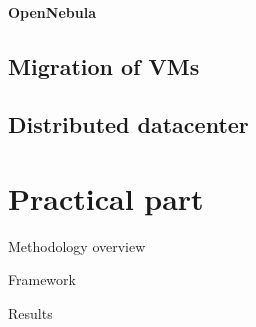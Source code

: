 \documentclass[12pt,oneside,a4paper]{report} %
\begin{document}
			\subsubsection{OpenNebula}

	\section{Migration of VMs}

	\section{Distributed datacenter}

	\pagebreak

\chapter{Practical part}

	Methodology overview

	Framework

	Results



\newpage
{} \label{listoffig}
\listoffigures

\newpage
{} \label{listoftab}
\listoftables


\printglossary[type=acronym,title=List of Abbreviations,toctitle=List of Abbreviations]


\end{document}
